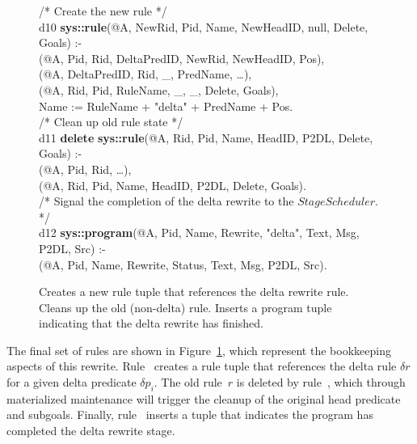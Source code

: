 \begin{figure}[!t]
\ssp
\centering
\begin{boxedminipage}{\linewidth}
/* Create the new rule */ \\
d10 {\bf sys::rule}(@A, NewRid, Pid, Name, NewHeadID, null, Delete, Goals) :- \\
(@A, Pid, Rid, DeltaPredID, NewRid, NewHeadID, Pos), \\
(@A, DeltaPredID, Rid, \_, PredName, \ldots), \\
(@A, Rid, Pid, RuleName, \_, \_, Delete, Goals), \\
\datalogspace Name := RuleName + "delta" + PredName + Pos. \\

/* Clean up old rule state */ \\
d11 {\bf delete} {\bf sys::rule}(@A, Rid, Pid, Name, HeadID, P2DL, Delete, Goals) :- \\
(@A, Pid, Rid, \ldots),  \\
(@A, Rid, Pid, Name, HeadID, P2DL, Delete, Goals). \\
  
/* Signal the completion of the delta rewrite to the $StageScheduler$. */ \\
d12 {\bf sys::program}(@A, Pid, Name, Rewrite, "delta", Text, Msg, P2DL, Src) :- \\
(@A, Pid, Name, Rewrite, Status, Text, Msg, P2DL, Src).

\end{boxedminipage}
\caption{\label{ch:evita:fig:delta4}Creates a new rule tuple that references the delta 
rewrite rule. Cleans up the old (non-delta) rule. Inserts a program tuple indicating
that the delta rewrite has finished. }
\end{figure}

The final set of rules are shown in Figure~\ref{ch:evita:fig:delta4}, which
represent the bookkeeping aspects of this rewrite.  Rule~ creates a
rule tuple that references the delta rule $\delta r$ for a given delta
predicate $\delta p_i$.  The old rule~$r$ is deleted by rule~, which
through materialized maintenance will trigger the cleanup of the original head
predicate and subgoals.  Finally, rule~ inserts a  tuple
that indicates the program has completed the delta rewrite stage.



